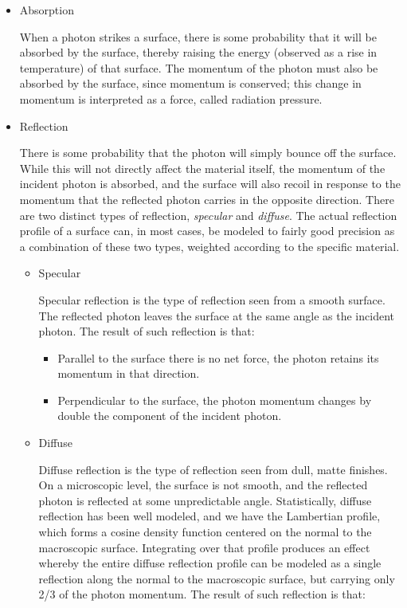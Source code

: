 \begin{itemize}
\item{Absorption}\par
When a photon strikes a surface, there is some probability that it will be
absorbed by the surface, thereby raising the energy (observed as a rise in
temperature) of that surface.  The momentum of the photon must also be
absorbed by the surface, since momentum is conserved; this change in momentum
is interpreted as a force, called radiation pressure.
\item{Reflection}\par
There is some probability that the photon will simply bounce off the surface.  While this will not directly affect the material itself, the momentum of the incident photon is absorbed, and the surface will also recoil in response to the momentum that the reflected photon carries in the opposite direction.  There are two distinct types of reflection, \textit{specular} and \textit{diffuse}.  The actual reflection profile of a surface can, in most cases, be modeled to fairly good precision as a combination of these two types, weighted according to the specific material.
\begin{itemize}
\item{Specular}\par
Specular reflection is the type of reflection seen from a smooth surface.  The reflected photon leaves the surface at the same angle as the incident photon.  The result of such reflection is that:
\begin{itemize}\par
\item Parallel to the surface there is no net force, the photon retains its momentum in that direction.
\item Perpendicular to the surface, the photon momentum changes by double the component of the incident photon.
\end{itemize}
\item{Diffuse}\par
Diffuse reflection is the type of reflection seen from dull, matte finishes.  On a microscopic level, the surface is not smooth, and the reflected photon is reflected at some unpredictable angle.  Statistically, diffuse reflection has been well modeled, and we have the Lambertian profile, which forms a cosine density function centered on the normal to the macroscopic surface.  Integrating over that profile produces an effect whereby the entire diffuse reflection profile can be modeled as a single reflection along the normal to the macroscopic surface, but carrying only 2/3 of the photon momentum.  The result of such reflection is that:

\end{itemize}
\end{itemize}
